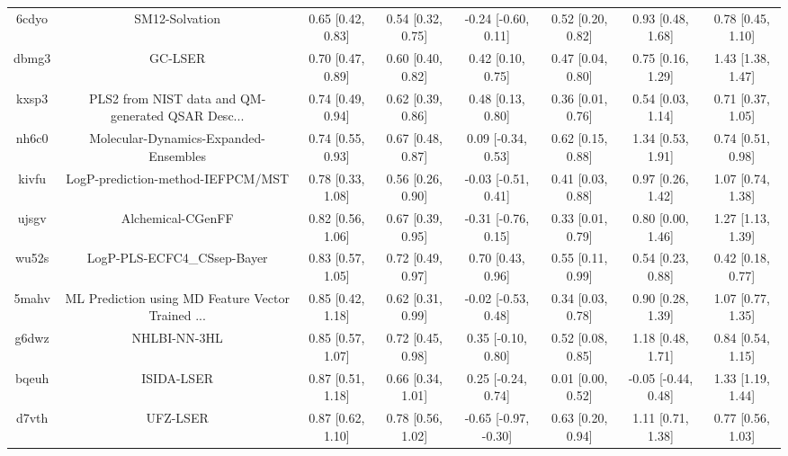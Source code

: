 \documentclass{article}
\begin{document}
\begin{center}
\begin{longtable}{|cccccccc|}
 6cdyo &                                     SM12-Solvation &  0.65 [0.42, 0.83] &  0.54 [0.32, 0.75] &   -0.24 [-0.60, 0.11] &  0.52 [0.20, 0.82] &    0.93 [0.48, 1.68] &     0.78 [0.45, 1.10] \\
 dbmg3 &                                            GC-LSER &  0.70 [0.47, 0.89] &  0.60 [0.40, 0.82] &     0.42 [0.10, 0.75] &  0.47 [0.04, 0.80] &    0.75 [0.16, 1.29] &     1.43 [1.38, 1.47] \\
 kxsp3 &  PLS2 from NIST data and QM-generated QSAR Desc... &  0.74 [0.49, 0.94] &  0.62 [0.39, 0.86] &     0.48 [0.13, 0.80] &  0.36 [0.01, 0.76] &    0.54 [0.03, 1.14] &     0.71 [0.37, 1.05] \\
 nh6c0 &              Molecular-Dynamics-Expanded-Ensembles &  0.74 [0.55, 0.93] &  0.67 [0.48, 0.87] &    0.09 [-0.34, 0.53] &  0.62 [0.15, 0.88] &    1.34 [0.53, 1.91] &     0.74 [0.51, 0.98] \\
 kivfu &                  LogP-prediction-method-IEFPCM/MST &  0.78 [0.33, 1.08] &  0.56 [0.26, 0.90] &   -0.03 [-0.51, 0.41] &  0.41 [0.03, 0.88] &    0.97 [0.26, 1.42] &     1.07 [0.74, 1.38] \\
 ujsgv &                                  Alchemical-CGenFF &  0.82 [0.56, 1.06] &  0.67 [0.39, 0.95] &   -0.31 [-0.76, 0.15] &  0.33 [0.01, 0.79] &    0.80 [0.00, 1.46] &     1.27 [1.13, 1.39] \\
 wu52s &                        LogP-PLS-ECFC4\_CSsep-Bayer &  0.83 [0.57, 1.05] &  0.72 [0.49, 0.97] &     0.70 [0.43, 0.96] &  0.55 [0.11, 0.99] &    0.54 [0.23, 0.88] &     0.42 [0.18, 0.77] \\
 5mahv &  ML Prediction using MD Feature Vector Trained ... &  0.85 [0.42, 1.18] &  0.62 [0.31, 0.99] &   -0.02 [-0.53, 0.48] &  0.34 [0.03, 0.78] &    0.90 [0.28, 1.39] &     1.07 [0.77, 1.35] \\
 g6dwz &                                       NHLBI-NN-3HL &  0.85 [0.57, 1.07] &  0.72 [0.45, 0.98] &    0.35 [-0.10, 0.80] &  0.52 [0.08, 0.85] &    1.18 [0.48, 1.71] &     0.84 [0.54, 1.15] \\
 bqeuh &                                         ISIDA-LSER &  0.87 [0.51, 1.18] &  0.66 [0.34, 1.01] &    0.25 [-0.24, 0.74] &  0.01 [0.00, 0.52] &  -0.05 [-0.44, 0.48] &     1.33 [1.19, 1.44] \\
 d7vth &                                           UFZ-LSER &  0.87 [0.62, 1.10] &  0.78 [0.56, 1.02] &  -0.65 [-0.97, -0.30] &  0.63 [0.20, 0.94] &    1.11 [0.71, 1.38] &     0.77 [0.56, 1.03] \\

\end{longtable}
\end{center}
\end{document}
